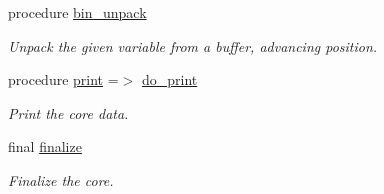 \begin{DoxyCompactItemize}
procedure \mbox{\hyperlink{structpmc__phlex__core_1_1phlex__core__t_a2c9d0d349accc52b7ee6fe1b3a59283d}{bin\+\_\+unpack}}
\begin{DoxyCompactList}\small\item\em Unpack the given variable from a buffer, advancing position. \end{DoxyCompactList}\item 
procedure \mbox{\hyperlink{structpmc__phlex__core_1_1phlex__core__t_acbc628b95095fe570be658a410590c90}{print}} =$>$ \mbox{\hyperlink{namespacepmc__phlex__core_a06f496bd886df92d34a981c082eecdb3}{do\+\_\+print}}
\begin{DoxyCompactList}\small\item\em Print the core data. \end{DoxyCompactList}\item 
final \mbox{\hyperlink{structpmc__phlex__core_1_1phlex__core__t_ad64d152f47eccfe6fd65affd7078ea79}{finalize}}
\begin{DoxyCompactList}\small\item\em Finalize the core. \end{DoxyCompactList}\end{DoxyCompactItemize}
